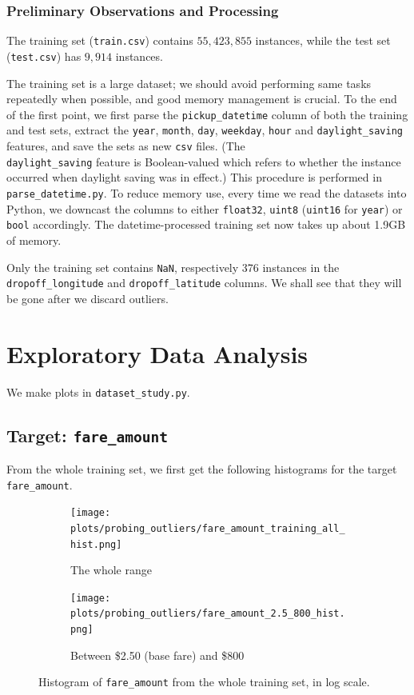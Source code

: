 \documentclass[12pt,letterpaper,final]{article}
\numberwithin{equation}{section}
\begin{document}
\subsubsection*{Preliminary Observations and Processing}
The training set (\verb|train.csv|) contains $55,423,855$ instances, while the test set (\verb|test.csv|) has $9,914$ instances. 

The training set is a large dataset; we should avoid performing same tasks repeatedly when possible, and good memory management is crucial. To the end of the first point, we first parse the \verb|pickup_datetime| column of both the training and test sets, extract the \verb|year|, \verb|month|, \verb|day|, \verb|weekday|, \verb|hour| and \verb|daylight_saving| features, and save the sets as new \verb|csv| files. (The \\ 
\verb|daylight_saving| feature is Boolean-valued which refers to whether the instance occurred when daylight saving was in effect.) This procedure is performed in \verb|parse_datetime.py|. To reduce memory use, every time we read the datasets into Python, we downcast the columns to either \verb|float32|, \verb|uint8| (\verb|uint16| for \verb|year|) or \verb|bool| accordingly. The datetime-processed training set now takes up about 1.9GB of memory.

Only the training set contains \verb|NaN|, respectively 376 instances in the \verb|dropoff_longitude| and \verb|dropoff_latitude| columns. We shall see that they will be gone after we discard outliers.


\section{Exploratory Data Analysis}

We make plots in \verb|dataset_study.py|.

\subsection{Target: \texttt{fare\_amount}}
From the whole training set, we first get the following histograms for the target \verb|fare_amount|.

\begin{figure}[H]
\centering
\begin{subfigure}{0.6\textwidth}
  \centering
  \texttt{[image: plots/probing\_outliers/fare\_amount\_training\_all\_hist.png]}
\caption{The whole range}
\end{subfigure}%
\hspace*{-2cm}
\begin{subfigure}{.6\textwidth}
  \centering
  \texttt{[image: plots/probing\_outliers/fare\_amount\_2.5\_800\_hist.png]}
  \caption{Between \$2.50 (base fare) and \$800}
  \label{fare_amount_2}
\end{subfigure}
\caption{Histogram of \texttt{fare\_amount} from the whole training set, in log scale.}
\label{fare_amount_training_all_hist}
\end{figure}
\end{document}
